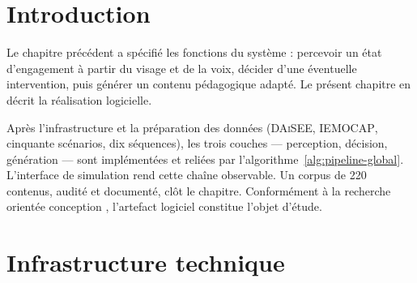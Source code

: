 
\section{Introduction}
\label{sec:ch4-intro}

Le chapitre précédent a spécifié les fonctions du système : percevoir
un état d'engagement à partir du visage et de la voix, décider d'une
éventuelle intervention, puis générer un contenu pédagogique adapté.
Le présent chapitre en décrit la réalisation logicielle.

Après l'infrastructure et la préparation des données
(\textsc{DAiSEE}, \textsc{IEMOCAP}, cinquante scénarios, dix
séquences), les trois couches --- perception, décision, génération ---
sont implémentées et reliées par l'algorithme~\ref{alg:pipeline-global}.
L'interface de simulation rend cette chaîne observable. Un corpus de
220 contenus, audité et documenté, clôt le chapitre.
Conformément à la recherche orientée conception \cite{hevner2004design},
l'artefact logiciel constitue l'objet d'étude.



\section{Infrastructure technique}
\label{sec:infrastructure}

